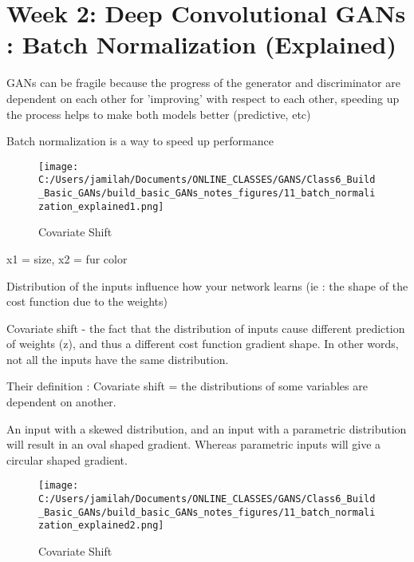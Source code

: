 \documentclass[11pt, onecolumn]{article}
\begin{document}
\clearpage
\section{Week 2: Deep Convolutional GANs : Batch Normalization (Explained)}

GANs can be fragile because the progress of the generator and discriminator are dependent on each other for 'improving' with respect to each other, speeding up the process helps to make both models better (predictive, etc)

Batch normalization is a way to speed up performance

\begin{figure}[htp]
\begin{center}
\texttt{[image: C:/Users/jamilah/Documents/ONLINE\_CLASSES/GANS/Class6\_Build\_Basic\_GANs/build\_basic\_GANs\_notes\_figures/11\_batch\_normalization\_explained1.png]}
\end{center}
\caption{Covariate Shift}
\label{11_batch_normalization_explained1}
\end{figure}
x1 = size, x2 = fur color

Distribution of the inputs influence how your network learns (ie : the shape of the cost function due to the weights)

Covariate shift - the fact that the distribution of inputs cause different prediction of weights (z), and thus a different cost function gradient shape.  In other words, not all the inputs have the same distribution.  

Their definition : Covariate shift = the distributions of some variables are dependent on another.


An input with a skewed distribution, and an input with a parametric distribution will result in an oval shaped gradient.  Whereas parametric inputs will give a circular shaped gradient.
 
\begin{figure}[htp]
\begin{center}
\texttt{[image: C:/Users/jamilah/Documents/ONLINE\_CLASSES/GANS/Class6\_Build\_Basic\_GANs/build\_basic\_GANs\_notes\_figures/11\_batch\_normalization\_explained2.png]}
\end{center}
\caption{Covariate Shift}
\label{11_batch_normalization_explained2}
\end{figure}
\end{document}
